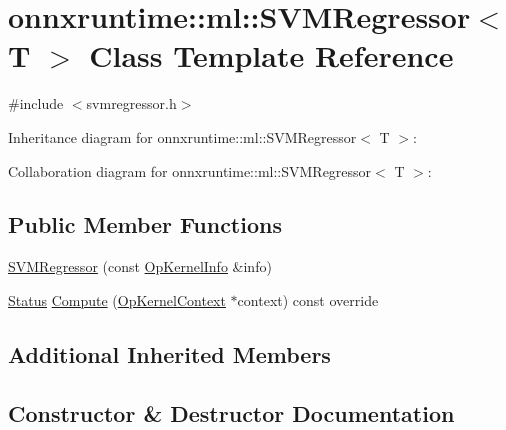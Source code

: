\hypertarget{classonnxruntime_1_1ml_1_1SVMRegressor}{}\section{onnxruntime\+:\+:ml\+:\+:S\+V\+M\+Regressor$<$ T $>$ Class Template Reference}
\label{classonnxruntime_1_1ml_1_1SVMRegressor}


{\ttfamily \#include $<$svmregressor.\+h$>$}



Inheritance diagram for onnxruntime\+:\+:ml\+:\+:S\+V\+M\+Regressor$<$ T $>$\+:


Collaboration diagram for onnxruntime\+:\+:ml\+:\+:S\+V\+M\+Regressor$<$ T $>$\+:
\subsection*{Public Member Functions}
\begin{DoxyCompactItemize}
\item 
\mbox{\hyperlink{classonnxruntime_1_1ml_1_1SVMRegressor_a21470d86a2b375dda77c78865dec3b4a}{S\+V\+M\+Regressor}} (const \mbox{\hyperlink{classonnxruntime_1_1OpKernelInfo}{Op\+Kernel\+Info}} \&info)
\item 
\mbox{\hyperlink{classonnxruntime_1_1common_1_1Status}{Status}} \mbox{\hyperlink{classonnxruntime_1_1ml_1_1SVMRegressor_a3620c635cd0b067dd69eafdeb4b0fda1}{Compute}} (\mbox{\hyperlink{classonnxruntime_1_1OpKernelContext}{Op\+Kernel\+Context}} $\ast$context) const override
\end{DoxyCompactItemize}
\subsection*{Additional Inherited Members}


\subsection{Constructor \& Destructor Documentation}
\mbox{\label{classonnxruntime_1_1ml_1_1SVMRegressor_a21470d86a2b375dda77c78865dec3b4a}} 
